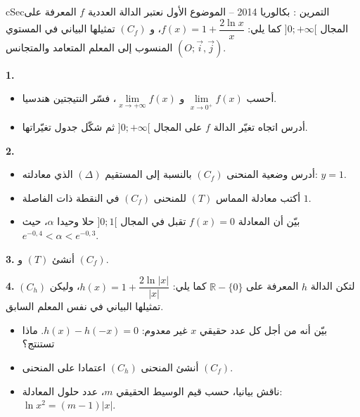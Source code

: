 \documentclass[12pt,a4paper]{article}
\newenvironment{BOX}[2]{\begin{otherlanguage}{english}\begin{arbox}{#1}{#2}}{\end{arbox}\end{otherlanguage}}
\newcounter{exo}
\newenvironment{tamrin}[1]{\stepcounter{exo}\begin{BOX}{cSec}{التمرين \theexo: #1}}{\end{BOX}}
\newcommand{\R}{\mathbb{R}}
\newenvironment{sq}{\begin{itemize}[leftmargin=2.4em,itemsep=3pt]}{\end{itemize}}
\newcommand{\qa}{\item[(أ)]}\newcommand{\qb}{\item[(ب)]}\newcommand{\qc}{\item[(جـ)]}\newcommand{\qd}{\item[(د)]}\newcommand{\qe}{\item[(هـ)]}
\newcommand{\QQ}[1]{\par\smallskip\textbf{#1.} }
\begin{document}
\begin{tamrin}{بكالوريا 2014 -- الموضوع الأول}
نعتبر الدالة العددية $f$ المعرفة على المجال $]0;+\infty[$ كما يلي: $f(x)=1+\dfrac{2\ln x}{x}$،
و $(C_f)$ تمثيلها البياني في المستوي المنسوب إلى المعلم المتعامد والمتجانس $(O;\vec i,\vec j)$.
\QQ{1}
\begin{sq}
\qa أحسب $\lim\limits_{x\to 0^{+}}f(x)$ و $\lim\limits_{x\to +\infty}f(x)$، فسّر النتيجتين هندسيا.
\qb أدرس اتجاه تغيّر الدالة $f$ على المجال $]0;+\infty[$ ثم شكّل جدول تغيّراتها.
\end{sq}
\QQ{2}
\begin{sq}
\qa أدرس وضعية المنحنى $(C_f)$ بالنسبة إلى المستقيم $(\Delta)$ الذي معادلته: $y=1$.
\qb أكتب معادلة المماس $(T)$ للمنحنى $(C_f)$ في النقطة ذات الفاصلة $1$.
\qc بيّن أن المعادلة $f(x)=0$ تقبل في المجال $]0;1[$ حلا وحيدا $\alpha$، حيث $e^{-0{,}4}<\alpha<e^{-0{,}3}$.
\end{sq}
\QQ{3} أنشئ $(T)$ و $(C_f)$.
\QQ{4} لتكن الدالة $h$ المعرفة على $\R-\{0\}$ كما يلي: $h(x)=1+\dfrac{2\ln|x|}{|x|}$،
وليكن $(C_h)$ تمثيلها البياني في نفس المعلم السابق.
\begin{sq}
\qa بيّن أنه من أجل كل عدد حقيقي $x$ غير معدوم: $h(x)-h(-x)=0$. ماذا تستنتج؟
\qb أنشئ المنحنى $(C_h)$ اعتمادا على المنحنى $(C_f)$.
\qc ناقش بيانيا، حسب قيم الوسيط الحقيقي $m$، عدد حلول المعادلة: $\ln x^2=(m-1)|x|$.
\end{sq}
\end{tamrin}
\end{document}
